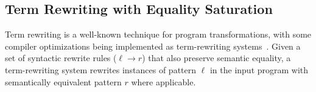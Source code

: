 




\subsection{Term Rewriting with Equality Saturation}
\label{sec.rewrite}

Term rewriting is a well-known technique 
  for program transformations,
  with some compiler optimizations being implemented
  as term-rewriting systems~\cite{
    dershowitz1993taste,
    baader1999term,
    blindell2016instruction,
    regis-pact22}.
Given a set of syntactic rewrite rules ($\ell \rightarrow r$) that also preserve semantic equality, 
  a term-rewriting system 
  rewrites instances of pattern $\ell$ 
  in the input program with semantically equivalent pattern $r$ where applicable.
  
